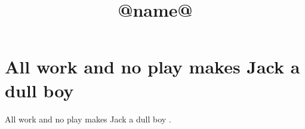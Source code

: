 \documentclass{article}
\title{@name@}
\begin{document}
\maketitle

\section{All work and no play makes Jack a dull boy}

All work and no play makes Jack a dull boy \citep{Jack1980}.



\end{document}
